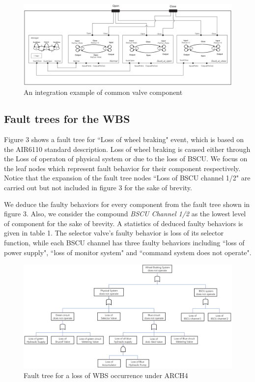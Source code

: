 \begin{figure}[htbp]
	\centerline{\includegraphics[width=165mm]{figure/Example.eps}}
	\caption{An integration example of common valve component}
	\label{Example}
\end{figure}

\subsection{Fault trees for the WBS}
Figure 3 shows a fault tree for ``Loss of wheel braking" event, which is based on the AIR6110 standard description. Loss of wheel braking is caused either through the Loss of operaton of physical system or due to the loss of BSCU. We focus on the leaf nodes which represent fault behavior for their component respectively. Notice that the expansion of the fault tree nodes ``Loss of BSCU channel 1/2" are carried out but not included in figure 3 for the sake of brevity.

We deduce the faulty behaviors for every component from the fault tree shown in figure 3. Also, we consider the compound \emph{BSCU Channel 1/2} as the lowest level of component for the sake of brevity. A statistics of deduced faulty behaviors is given in table 1. The selector valve's faulty behavior is loss of its selector function, while each BSCU channel has three faulty behaviors including ``loss of power supply", ``loss of monitor system" and ``command system does not operate".

\begin{figure}[hb]
	\centerline{\includegraphics[width=165mm]{figure/fault_tree.eps}}
	\caption{Fault tree for a loss of WBS occurrence under ARCH4}
	\label{WBS_BIP_Nominal}
\end{figure}

